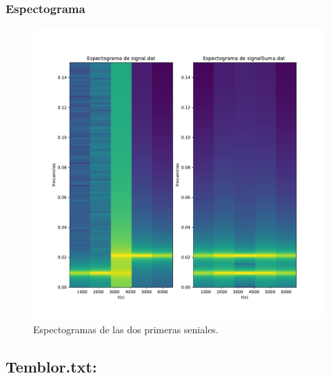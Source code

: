 \documentclass[11pt,letterpaper]{exam}
\begin{document}
\subsubsection{Espectograma}
\begin{figure}[H]
    \centering
    \includegraphics[width=1\textwidth]{espectograma.pdf}
    \caption{Espectogramas de las dos primeras seniales.}
    \label{fig:my_label}
\end{figure}
\subsection{Temblor.txt:}
\end{document}
